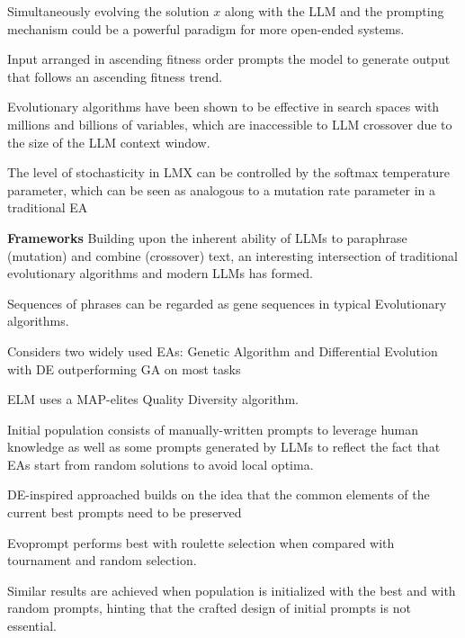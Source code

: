 Simultaneously evolving the solution $\mathit{x}$ along with the LLM and the prompting mechanism could be a powerful paradigm for more open-ended systems. \cite{meyerson2024languagemodelcrossovervariation}

Input arranged in ascending fitness order prompts the model to generate output that follows an ascending fitness trend. \cite{meyerson2024languagemodelcrossovervariation}

Evolutionary algorithms have been shown to be effective in search spaces with millions and billions of variables, which are inaccessible to LLM crossover due to the size of the LLM context window. \cite{meyerson2024languagemodelcrossovervariation}

The level of stochasticity in LMX can be controlled by the softmax temperature parameter, which can be seen as analogous to a mutation rate parameter in a traditional EA \cite{meyerson2024languagemodelcrossovervariation}


\textbf{Frameworks}
Building upon the inherent ability of LLMs to paraphrase (mutation) and 
combine (crossover) text, an interesting intersection of traditional evolutionary algorithms and modern LLMs has formed. 


Sequences of phrases can be regarded as gene sequences in 
typical Evolutionary algorithms. \cite{guo2024connectinglargelanguagemodels}


Considers two widely used EAs: Genetic Algorithm and 
Differential Evolution with DE outperforming GA on most tasks \cite{guo2024connectinglargelanguagemodels}

ELM uses a MAP-elites Quality Diversity algorithm. \cite{lehman2022evolutionlargemodels}

Initial population consists of manually-written prompts to leverage human knowledge as well as some prompts generated by LLMs to reflect the fact that EAs start from random solutions to avoid local optima. \cite{guo2024connectinglargelanguagemodels}

DE-inspired approached builds on the idea that the common elements of the current best prompts need to be preserved \cite{guo2024connectinglargelanguagemodels}

Evoprompt performs best with roulette selection when compared with tournament and random selection. \cite{guo2024connectinglargelanguagemodels}

Similar results are achieved when population is initialized with the best and with random prompts, hinting that the crafted design of initial prompts is not essential. \cite{guo2024connectinglargelanguagemodels}


